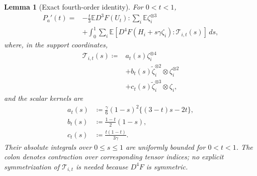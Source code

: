 \documentclass[11pt,letterpaper]{article}
\newtheorem{lemma}{Lemma}
\theoremstyle{remark}
\newcommand{\E}{\mathbb E}
\newcommand{\dd}{\,d}
\begin{document}
\begin{lemma}[Exact fourth-order identity]\label{appx-an:lem:identity}
For \(0<t<1\),
\begin{equation}
 \begin{aligned}
 P_a'(t)
 ={}&-\frac t3\E D^3F(U_t):\sum_i\E\zeta_i^{\otimes3}\\
 &+\int_0^1\sum_i\E\left[
 D^4F(H_i+s\gamma\zeta_i):\mathcal T_{i,t}(s)
 \right]\dd s,
 \end{aligned}
 \label{appx-an:fourth-identity}
\end{equation}
where, in the support coordinates,
\[
 \begin{aligned}
 \mathcal T_{i,t}(s)\coloneqq{}&a_t(s)\zeta_i^{\otimes4}\\
 &+b_t(s)\widetilde\zeta_i^{\otimes2}\otimes\zeta_i^{\otimes2}\\
 &+c_t(s)\widetilde\zeta_i^{\otimes3}\otimes\zeta_i,
 \end{aligned}
\]
and the scalar kernels are
\begin{equation}
 \begin{aligned}
 a_t(s)&\coloneqq\frac\gamma6(1-s)^2\{(3-t)s-2t\},\\
 b_t(s)&\coloneqq\frac{1-t}{2}(1-s),\\
 c_t(s)&\coloneqq\frac{t(1-t)}{3\gamma}.
 \end{aligned}
 \label{appx-an:kernel}
\end{equation}
Their absolute integrals over \(0\le s\le1\) are uniformly bounded
for \(0<t<1\). The colon denotes contraction over corresponding
tensor indices; no explicit symmetrization of \(\mathcal T_{i,t}\)
is needed because \(D^4F\) is symmetric.
\end{lemma}
\end{document}
